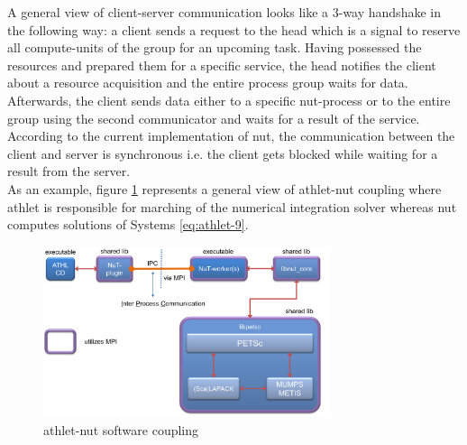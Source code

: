 A general view of client-server communication looks like a 3-way handshake in the following way: a client sends a request to the head which is a signal to reserve all compute-units of the group for an upcoming task. Having possessed the resources and prepared them for a specific service, the head notifies the client about a resource acquisition and the entire process group waits for data. Afterwards, the client sends data either to a specific \acrshort{nut}-process or to the entire group using the second communicator and waits for a result of the service. According to the current implementation of \acrshort{nut}, the communication between the client and server is synchronous i.e. the client gets blocked while waiting for a result from the server. \\


As an example, figure \ref{fig:introduction-athlet-nut-coupling} represents a general view of \acrshort{athlet}-\acrshort{nut} coupling where \acrshort{athlet} is responsible for marching of the numerical integration solver whereas \acrshort{nut} computes solutions of Systems \ref{eq:athlet-9}.\\


\figpointer{\ref{fig:introduction-athlet-nut-coupling}}
\begin{figure}
  \centering
  \includegraphics[width=0.75\textwidth]{figures/introduction-athlet-nut-coupling.png}
    \caption{\acrshort{athlet}-\acrshort{nut} software coupling}
\label{fig:introduction-athlet-nut-coupling}
\end{figure}


